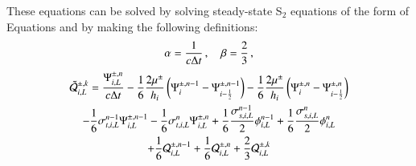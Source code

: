 \documentclass[preprint,12pt]{elsarticle}
\begin{document}
These equations can be solved by solving steady-state S$_2$ equations
of the form of Equations  and  by making
the following definitions:
\begin{equation}
  \alpha = \frac{1}{c\Delta t} \, , \quad \beta = \frac{2}{3} \, ,
\end{equation}
\begin{multline}
  \tilde{\mathcal{Q}}_{i,L}^{\pm,k}
  = \frac{\Psi_{i,L}^{\pm,n}}{c\Delta t}
  - \frac{1}{6}\frac{2\mu^\pm}{h_i}\left( \Psi_i^{\pm,n-1} - \Psi_{i-\frac{1}{2}}^{\pm,n-1} \right)
  - \frac{1}{6}\frac{2\mu^\pm}{h_i}\left( \Psi_i^{\pm,n} - \Psi_{i-\frac{1}{2}}^{\pm,n} \right)\\
  - \frac{1}{6}\sigma_{t,i,L}^{n-1}\Psi_{i,L}^{\pm,n-1}
  - \frac{1}{6}\sigma_{t,i,L}^n    \Psi_{i,L}^{\pm,n}
  + \frac{1}{6}\frac{\sigma_{s,i,L}^{n-1}}{2}\phi_{i,L}^{n-1}
  + \frac{1}{6}\frac{\sigma_{s,i,L}^n}{2}    \phi_{i,L}^n\\
  + \frac{1}{6}\mathcal{Q}_{i,L}^{\pm,n-1}
  + \frac{1}{6}\mathcal{Q}_{i,L}^{\pm,n}
  + \frac{2}{3}\mathcal{Q}_{i,L}^{\pm,k}
\end{multline}
\end{document}
